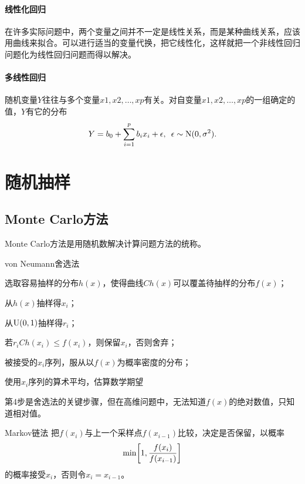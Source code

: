 \paragraph{线性化回归}
在许多实际问题中，两个变量之间并不一定是线性关系，而是某种曲线关系，应该用曲线来拟合。可以进行适当的变量代换，把它线性化，这样就把一个非线性回归问题化为线性回归问题而得以解决。
\paragraph{多线性回归}
随机变量$ Y $往往与多个变量$ x1, x2, \ldots , xp $有关。对自变量$ x1, x2, \ldots, xp $的一组确定的值，$Y $有它的分布
\[
	Y=b_0+\sum_{i=1}^pb_ix_i+\epsilon,\enspace\epsilon\sim\operatorname{N}(0,\sigma^2).
\]

\clearpage
\section{随机抽样}
\subsection{Monte Carlo方法}
Monte Carlo方法是用随机数解决计算问题方法的统称。
\begin{theorem}{von Neumann舍选法}{}
	\begin{compactenum}
		\item 选取容易抽样的分布$h(x)$，使得曲线$Ch(x)$可以覆盖待抽样的分布$f(x)$；
		\item 从$h(x)$抽样得$x_i$；
		\item 从$\operatorname{U}(0,1)$抽样得$r_i$；
		\item 若$r_iCh(x_i)\leqslant f(x_i)$，则保留$x_i$，否则舍弃；
		\item 被接受的$x_i$序列，服从以$f(x)$为概率密度的分布；
		\item 使用$x_i$序列的算术平均，估算数学期望
	\end{compactenum}
\end{theorem}
第4步是舍选法的关键步骤，但在高维问题中，无法知道$f(x)$的绝对数值，只知道相对值。
\begin{theorem}{Markov链法}{}
	把$f(x_i)$与上一个采样点$f(x_{i-1})$比较，决定是否保留，以概率
	\[
		\min\biggl[1,\frac{f(x_i)}{f(x_{i-1})}\biggr]
	\]
	的概率接受$x_i$，否则令$x_i=x_{i-1}$。
\end{theorem}

